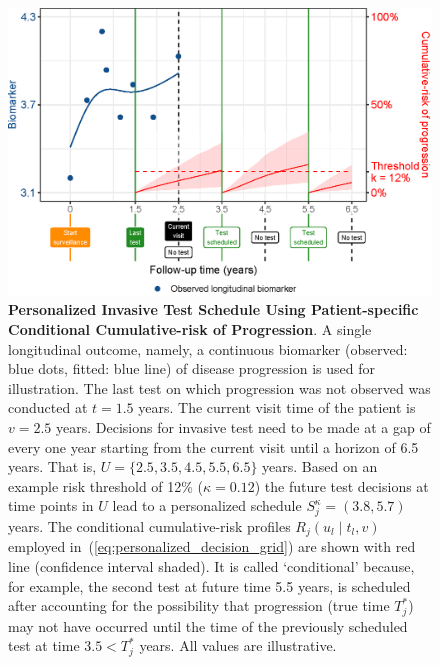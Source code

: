\begin{figure}
\centerline{\includegraphics{images/schedule_explanation_102.eps}}
\caption{\textbf{Personalized Invasive Test Schedule Using Patient-specific Conditional Cumulative-risk of Progression}.  A single longitudinal outcome, namely, a continuous biomarker (observed: blue dots, fitted: blue line) of disease progression is used for illustration. The last test on which progression was not observed was conducted at $t=1.5$ years. The current visit time of the patient is $v=2.5$ years. Decisions for invasive test need to be made at a gap of every one year starting from the current visit until a horizon of 6.5 years. That is, $U=\{2.5, 3.5, 4.5, 5.5, 6.5\}$ years. Based on an example risk threshold of 12\% ($\kappa=0.12$) the future test decisions at time points in $U$ lead to a personalized schedule $S_j^{\kappa} = (3.8, 5.7)$ years. The conditional cumulative-risk profiles $R_j(u_l \mid t_l, v)$ employed in~(\ref{eq:personalized_decision_grid}) are shown with red line (confidence interval shaded). It is called `conditional' because, for example, the second test at future time 5.5 years, is scheduled after accounting for the possibility that progression (true time $T^*_j$) may not have occurred until the time of the previously scheduled test at time $3.5 < T^*_j$ years. All values are illustrative.} 
\label{fig:schedule_explanation}
\end{figure}

